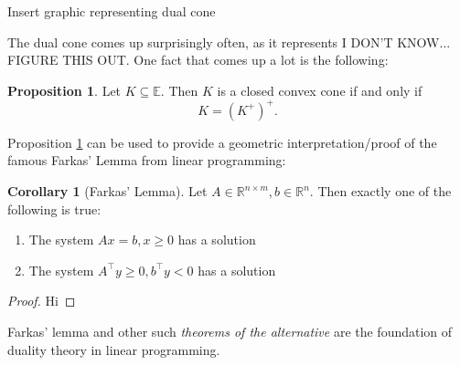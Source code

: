 \documentclass[11pt]{article}
\numberwithin{equation}{section}
\theoremstyle{definition}
\newtheorem{corollary}[theorem]{Corollary}
\newtheorem{proposition}[theorem]{Proposition}
\newcommand{\bE}{\mathbb{E}}
\newcommand{\bR}{\mathbb{R}}
\begin{document}
Insert graphic representing dual cone

The dual cone comes up surprisingly often, as it represents I DON'T KNOW... FIGURE THIS OUT. One fact that comes up a lot is the following:
\begin{proposition}
    \label{prpccciffselfdual}
    Let $K\subseteq\bE$. Then $K$ is a closed convex cone if and only if
    \begin{equation}
        K=(K^+)^+.
    \end{equation}
\end{proposition}
Proposition \ref{prpccciffselfdual} can be used to provide a geometric interpretation/proof of the famous Farkas' Lemma from linear programming:
\begin{corollary}[Farkas' Lemma]
    Let $A\in\bR^{n\times m}, b\in\bR^n$. Then exactly one of the following is true:
    \begin{enumerate}[label=(\roman*)]
        \item The system $Ax=b, x\ge 0$ has a solution
        \item The system $A^\top y\ge 0, b^\top y<0$ has a solution
    \end{enumerate}
\end{corollary}
\begin{proof}
Hi
\end{proof}
Farkas' lemma and other such \textit{theorems of the alternative} are the foundation of duality theory in linear programming.
\end{document}
